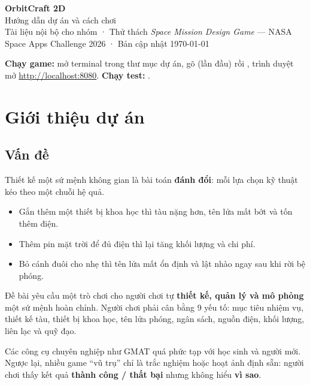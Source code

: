 \documentclass[11pt]{article}
\begin{document}
{\sffamily
{\fontsize{26}{30}\selectfont\bfseries\color{accent} OrbitCraft 2D}\\[2pt]
{\Large\color{ink} Hướng dẫn dự án và cách chơi}\\[6pt]
{\small\color{muted} Tài liệu nội bộ cho nhóm · Thử thách \emph{Space Mission Design Game} --- NASA Space Apps Challenge 2026 · Bản cập nhật \today}\par}
\vspace{4pt}{\color{accent}\rule{\linewidth}{1.2pt}}

\begin{tipbox}
\textbf{Chạy game:} mở terminal trong thư mục dự án, gõ  (lần đầu) rồi , trình duyệt mở \url{http://localhost:8080}. \quad
\textbf{Chạy test:} .
\end{tipbox}

{\small\setcounter{tocdepth}{2}\tableofcontents}

\section{Giới thiệu dự án}

\subsection{Vấn đề}

Thiết kế một sứ mệnh không gian là bài toán \textbf{đánh đổi}: mỗi lựa chọn kỹ thuật kéo theo một chuỗi hệ quả.

\begin{itemize}
  \item Gắn thêm một thiết bị khoa học thì tàu nặng hơn, tên lửa mất bớt \dv{} và tốn thêm điện.
  \item Thêm pin mặt trời để đủ điện thì lại tăng khối lượng và chi phí.
  \item Bỏ cánh đuôi cho nhẹ thì tên lửa mất ổn định và lật nhào ngay sau khi rời bệ phóng.
\end{itemize}

Đề bài yêu cầu một trò chơi cho người chơi tự \textbf{thiết kế, quản lý và mô phỏng} một sứ mệnh hoàn chỉnh. Người chơi phải cân bằng 9 yếu tố: mục tiêu nhiệm vụ, thiết kế tàu, thiết bị khoa học, tên lửa phóng, ngân sách, nguồn điện, khối lượng, liên lạc và quỹ đạo.

Các công cụ chuyên nghiệp như GMAT quá phức tạp với học sinh và người mới. Ngược lại, nhiều game ``vũ trụ'' chỉ là trắc nghiệm hoặc hoạt ảnh định sẵn: người chơi thấy kết quả \textbf{thành công / thất bại} nhưng không hiểu \textbf{vì sao}.
\end{document}
